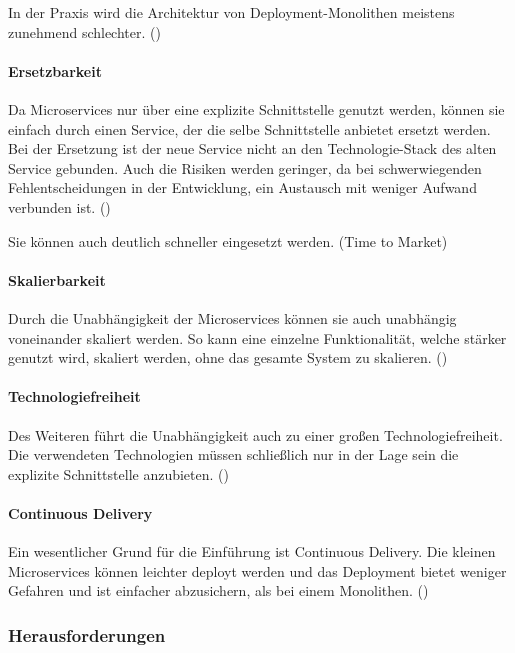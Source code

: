 In der Praxis wird die Architektur von Deployment-Monolithen meistens zunehmend schlechter. (\cite[S. 3]{wolffMicroservices2018})

\paragraph{Ersetzbarkeit}
Da Microservices nur über eine explizite Schnittstelle genutzt werden, können sie einfach durch einen Service, der die selbe Schnittstelle anbietet ersetzt werden. Bei der Ersetzung ist der neue Service nicht an den Technologie-Stack des alten Service gebunden. Auch die Risiken werden geringer, da bei schwerwiegenden Fehlentscheidungen in der Entwicklung, ein Austausch mit weniger Aufwand verbunden ist. (\cite[S. 4]{wolffMicroservices2018})

Sie können auch deutlich schneller eingesetzt werden. (Time to Market)

\paragraph{Skalierbarkeit}
Durch die Unabhängigkeit der Microservices können sie auch unabhängig voneinander skaliert werden. So kann eine einzelne Funktionalität, welche stärker genutzt wird, skaliert werden, ohne das gesamte System zu skalieren. (\cite[S. 5]{wolffMicroservices2018})

\paragraph{Technologiefreiheit}

Des Weiteren führt die Unabhängigkeit auch zu einer großen Technologiefreiheit. Die verwendeten Technologien müssen schließlich nur in der Lage sein die explizite Schnittstelle anzubieten. (\cite[S. 5]{wolffMicroservices2018})



\paragraph{Continuous Delivery}

Ein wesentlicher Grund für die Einführung ist Continuous Delivery. Die kleinen Microservices können leichter deployt werden und das Deployment bietet weniger Gefahren und ist einfacher abzusichern, als bei einem Monolithen. (\cite[S. 5]{wolffMicroservices2018})

\subsubsection{Herausforderungen}

